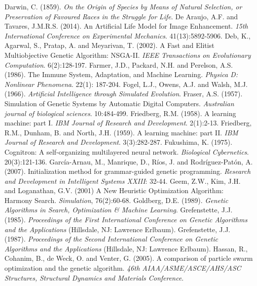 \documentclass[spanish,a4paper,12pt,twoside]{report}
\begin{document}
\begin{thebibliography}{00}
   Darwin, C. (1859). \emph{On the Origin of Species by Means of Natural Selection, or Preservation of Favoured Races in the Struggle for Life}. 
   De Araujo, A.F. and Tavares, J.M.R.S. (2014). An Artificial Life Model for Image Enhancement. \emph{15th International Conference on Experimental Mechanics}. 41(13):5892-5906.
   Deb, K., Agarwal, S., Pratap, A. and Meyarivan, T. (2002). A Fast and Elitist Multiobjective Genetic Algorithm: NSGA-II. \emph{IEEE Transactions on Evolutionary Computation}. 6(2):128-197.
   Farmer, J.D., Packard, N.H. and Perelson, A.S. (1986). The Immune System, Adaptation, and Machine Learning. \emph{Physica D: Nonlinear Phenomena}. 22(1): 187-204.
   Fogel, L.J., Owens, A.J. and Walsh, M.J. (1966). \emph{Artificial Intelligence through Simulated Evolution}.
   Fraser, A.S. (1957). Simulation of Genetic Systems by Automatic Digital Computers. \emph{Australian journal of biological sciences}. 10:484-499.
   Friedberg, R.M. (1958). A learning machine: part I. \emph{IBM Journal of Research and Development}. 2(1):2-13.
   Friedberg, R.M., Dunham, B. and North, J.H. (1959). A learning machine: part II. \emph{IBM Journal of Research and Development}. 3(3):282-287.
   Fukushima, K. (1975). Cognitron: A self-organizing multilayered neural network. \emph{Biological Cybernetics}. 20(3):121-136.
   García-Arnau, M., Manrique, D., Ríos, J. and Rodríguez-Patón, A. (2007). Initialization method for grammar-guided genetic programming. \emph{Research and Development in Intelligent Systems XXIII}: 32-44.
   Geem, Z.W., Kim, J.H. and Loganathan, G.V. (2001) A New Heuristic Optimization Algorithm: Harmony Search. \emph{Simulation}, 76(2):60-68.
   Goldberg, D.E. (1989). \emph{Genetic Algorithms in Search, Optimization \& Machine Learning}.
   Grefenstette, J.J. (1985). \emph{Proceedings of the First International Conference on Genetic Algorithms and the Applications} (Hillsdale, NJ: Lawrence Erlbaum).
   Grefenstette, J.J. (1987). \emph{Proceedings of the Second International Conference on Genetic Algorithms and the Applications} (Hillsdale, NJ: Lawrence Erlbaum).
   Hassan, R., Cohanim, B., de Weck, O. and Venter, G. (2005). A comparison of particle swarm optimization and the genetic algorithm. \emph{46th AIAA/ASME/ASCE/AHS/ASC Structures, Structural Dynamics and Materials Conference}.

\end{thebibliography}
\end{document}

